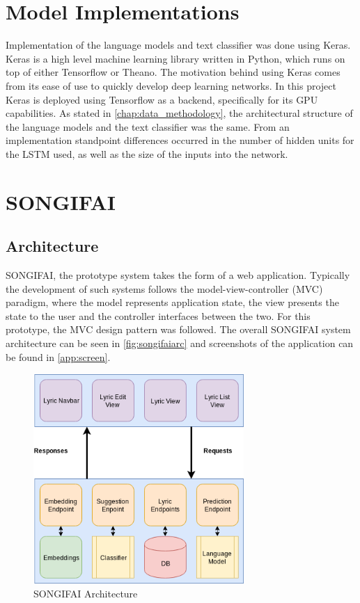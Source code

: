 \section{Model Implementations}
Implementation of the language models and text classifier was done using Keras. Keras is a high level machine learning library written in Python, which runs on top of either Tensorflow or Theano. The motivation behind using Keras comes from its ease of use to quickly develop deep learning networks. In this project Keras is deployed using Tensorflow as a backend, specifically for its GPU capabilities. As stated in \autoref{chap:data_methodology}, the architectural structure of the language models and the text classifier was the same. From an implementation standpoint differences occurred in the number of hidden units for the LSTM used, as well as the size of the inputs into the network. 



\section{SONGIFAI}
\subsection{Architecture}
SONGIFAI, the prototype system takes the form of a web application. Typically the development of such systems follows the model-view-controller (MVC) paradigm, where the model represents application state, the view presents the state to the user and the controller interfaces between the two. For this prototype, the MVC design pattern was followed. The overall SONGIFAI system architecture can be seen in \autoref{fig:songifaiarc} and screenshots of the application can be found in \autoref{app:screen}.
\begin{figure}[ht]
	\centering
	\includegraphics[width=8cm, height=8cm]{./figures/fig22}
	\caption[SONGIFAI Architecture]{SONGIFAI Architecture}
	\label{fig:songifaiarc}
\end{figure}

